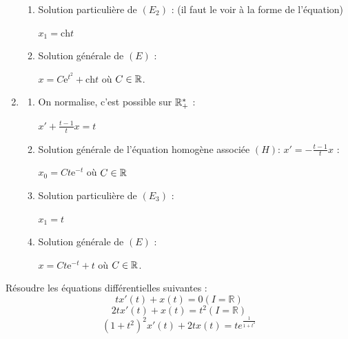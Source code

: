 \documentclass{book}
\begin{document}
\begin{Exercice}
\begin{Correction}
\begin{enumerate}
\begin{enumerate}
		\item Solution particulière  de $(E_2)$ : (il faut le \og voir  \fg{} à la forme de l'équation)

			\hspace{0.7cm} $x_1 = \mathrm{ch} t$ 

		\item Solution générale de $(E)$ :
    
		    \hspace{0.7cm} $x = C \mathrm{e}^{t^2}  +\mathrm{ch} t$   où $C \in \mathbb{R}$.
	\end{enumerate}


\item %

	\begin{enumerate}
		\item On normalise, c'est possible sur $\mathbb{R}^*_+$ : 
		
			\hspace{0.7cm} $x'+ \frac{t-1}{t} x= t$
	
		\item Solution générale de l'équation homogène associée $(H) : \, x' = - \frac{t-1}{t} x$ :

			\hspace{0.7cm} $x_0 = C t  \mathrm{e}^{-t} $ où $C \in \mathbb{R}$	

		\item Solution particulière  de $(E_3)$ :

			\hspace{0.7cm} $x_1 = t$ 

		\item Solution générale de $(E)$ :
    
		    \hspace{0.7cm} $x = C t  \mathrm{e}^{-t}  + t$   où $C \in \mathbb{R}$.
	\end{enumerate}
\end{enumerate}
\end{Correction}
\end{Exercice}
\begin{Exercice}
Résoudre les équations différentielles suivantes :
$$tx'(t) + x(t) = 0 (I = \mathbb{R})$$
$$ 2t x'(t) + x(t) = t^2 (I = \mathbb{R})$$
$$ (1+t^2)^2x'(t) + 2tx(t) = t e^{\frac{1}{1+t^2}}$$
\end{Exercice}
\end{document}
